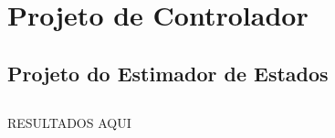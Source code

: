 \chapter{Projeto de Controlador} \label{cap5}
\section{Projeto do Estimador de Estados}
\section{}
RESULTADOS AQUI





















